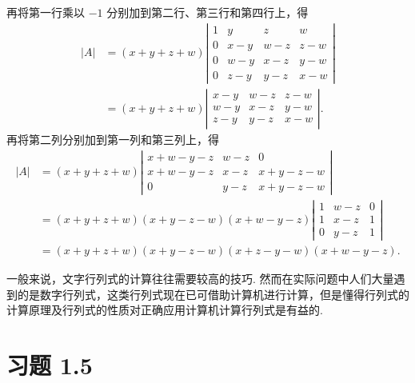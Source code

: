 \documentclass[UTF8,12pt,a4paper,fontset=fandol]{ctexart}
\begin{document}
再将第一行乘以 $-1$ 分别加到第二行、第三行和第四行上，得
\[
\begin{aligned}
|A|
&=(x+y+z+w)
\left|\begin{array}{rrrr}
1 & y & z & w\\
0 & x-y & w-z & z-w\\
0 & w-y & x-z & y-w\\
0 & z-y & y-z & x-w
\end{array}\right|\\
&=(x+y+z+w)
\left|\begin{array}{rrr}
x-y & w-z & z-w\\
w-y & x-z & y-w\\
z-y & y-z & x-w
\end{array}\right|.
\end{aligned}
\]
再将第二列分别加到第一列和第三列上，得
\[
\begin{aligned}
|A|
&=(x+y+z+w)
\left|\begin{array}{rrr}
x+w-y-z & w-z & 0\\
x+w-y-z & x-z & x+y-z-w\\
0 & y-z & x+y-z-w
\end{array}\right|\\
&=(x+y+z+w)(x+y-z-w)(x+w-y-z)
\left|\begin{array}{rrr}
1 & w-z & 0\\
1 & x-z & 1\\
0 & y-z & 1
\end{array}\right|\\
&=(x+y+z+w)(x+y-z-w)(x+z-y-w)(x+w-y-z).
\end{aligned}
\]

一般来说，文字行列式的计算往往需要较高的技巧. 然而在实际问题中人们大量遇到的是数字行列式，这类行列式现在已可借助计算机进行计算，但是懂得行列式的计算原理及行列式的性质对正确应用计算机计算行列式是有益的.

\section*{习题 1.5}
\end{document}
